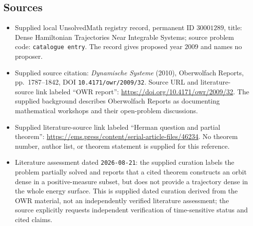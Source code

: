 \documentclass[11pt]{article}
\begin{document}
\subsection{Sources}
\begin{itemize}
\item Supplied local UnsolvedMath registry record, permanent ID \(30001289\), title: Dense Hamiltonian Trajectories Near Integrable Systems; source problem code: \texttt{catalogue entry}. The record gives proposed year \(2009\) and names no proposer.
\item Supplied source citation: \emph{Dynamische Systeme} (2010), Oberwolfach Reports, pp.\ 1787--1842, DOI \texttt{10.4171/owr/2009/32}. Source URL and literature-source link labeled ``OWR report'': \url{https://doi.org/10.4171/owr/2009/32}. The supplied background describes Oberwolfach Reports as documenting mathematical workshops and their open-problem discussions.
\item Supplied literature-source link labeled ``Herman question and partial theorem'': \url{https://ems.press/content/serial-article-files/46234}. No theorem number, author list, or theorem statement is supplied for this reference.
\item Literature assessment dated \texttt{2026-08-21}: the supplied curation labels the problem partially solved and reports that a cited theorem constructs an orbit dense in a positive-measure subset, but does not provide a trajectory dense in the whole energy surface. This is supplied dated curation derived from the OWR material, not an independently verified literature assessment; the source explicitly requests independent verification of time-sensitive status and cited claims.
\end{itemize}
\end{document}
